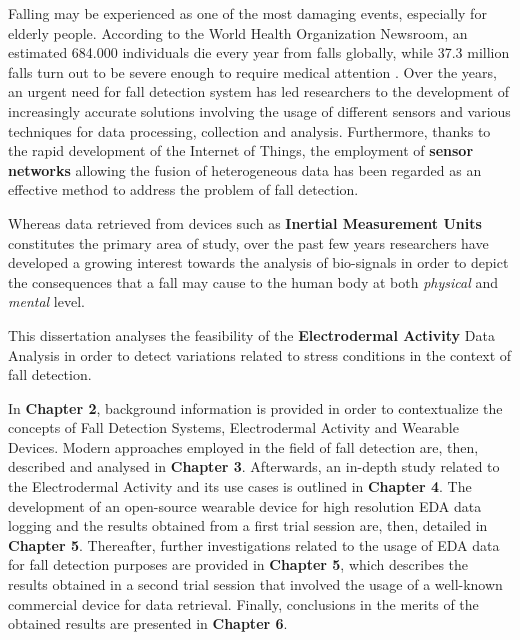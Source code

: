 \label{ch:introduction}

Falling may be experienced as one of the most damaging events, especially for elderly people. According to the World Health Organization Newsroom, an estimated 684.000 individuals die every year from falls globally, while 37.3 million falls turn out to be severe enough to require medical attention \cite{WhoData}. 
Over the years, an urgent need for fall detection system has led researchers to the development of increasingly accurate solutions involving the usage of different sensors and various techniques for data processing, collection and analysis.
Furthermore, thanks to the rapid development of the Internet of Things, the employment of \textbf{sensor networks} allowing the fusion of heterogeneous data has been regarded as an effective method to address the problem of fall detection.

Whereas data retrieved from devices such as \textbf{Inertial Measurement Units} constitutes the primary area of study, over the past few years researchers have developed a growing interest towards the analysis of bio-signals in order to depict the consequences that a fall may cause to the human body at both \textit{physical} and \textit{mental} level.

This dissertation analyses the feasibility of the \textbf{Electrodermal Activity} Data Analysis in order to detect variations related to stress conditions in the context of fall detection. 

In \textbf{Chapter 2}, background information is provided in order to contextualize the concepts of Fall Detection Systems, Electrodermal Activity and Wearable Devices. Modern approaches employed in the field of fall detection are, then, described and analysed in \textbf{Chapter 3}. Afterwards, an in-depth study related to the Electrodermal Activity and its use cases is outlined in \textbf{Chapter 4}. The development of an open-source wearable device for high resolution EDA data logging and the results obtained from a first trial session are, then, detailed in \textbf{Chapter 5}. Thereafter, further investigations related to the usage of EDA data for fall detection purposes are provided in \textbf{Chapter 5}, which describes the results obtained in a second trial session that involved the usage of a well-known commercial device for data retrieval. Finally, conclusions in the merits of the obtained results are presented in \textbf{Chapter 6}.
